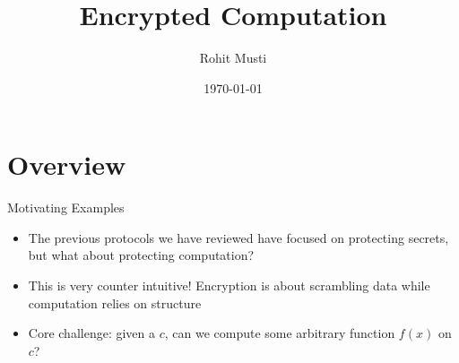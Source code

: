 \documentclass[handout]{beamer}
\title{Encrypted Computation}
\author{Rohit Musti}
\institute{CUNY - Hunter College}
\date{\today}
\begin{document}
 
\frame{\titlepage}

\section{Overview}

\begin{frame}{Motivating Examples}
  \begin{itemize}
    \item \pause The previous protocols we have reviewed have focused on protecting secrets, but what about protecting computation?
    \item \pause This is very counter intuitive! Encryption is about scrambling data while computation relies on structure
    \item \pause Core challenge: given a \(c\), can we compute some arbitrary function \(f(x)\) on \(c\)?
  \end{itemize} 
\end{frame}
\end{document}
